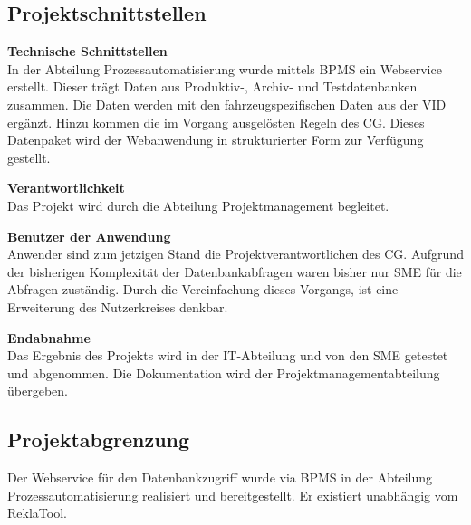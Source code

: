 \subsection{Projektschnittstellen} 
\label{sec:Projektschnittstellen}
\textbf{Technische Schnittstellen}\\
In der Abteilung Prozessautomatisierung wurde mittels \acs{BPMS} ein Webservice erstellt.
Dieser trägt Daten aus Produktiv-, Archiv- und Testdatenbanken zusammen.
Die Daten werden mit den fahrzeugspezifischen Daten aus der \acs{VID} ergänzt.
Hinzu kommen die im Vorgang ausgelösten Regeln des \acs{CG}.
Dieses Datenpaket wird der Webanwendung in strukturierter Form zur Verfügung gestellt.

\textbf{Verantwortlichkeit}\\
Das Projekt wird durch die Abteilung Projektmanagement begleitet.

\textbf{Benutzer der Anwendung}\\
Anwender sind zum jetzigen Stand die Projektverantwortlichen des \acs{CG}.
Aufgrund der bisherigen Komplexität der Datenbankabfragen waren bisher nur \ac{SME}
für die Abfragen zuständig. Durch die Vereinfachung dieses Vorgangs, ist eine Erweiterung des Nutzerkreises denkbar.

\textbf{Endabnahme}\\
Das Ergebnis des Projekts wird in der IT-Abteilung und von den \acs{SME} getestet und abgenommen.
Die Dokumentation wird der Projektmanagementabteilung übergeben.

\subsection{Projektabgrenzung} 
\label{sec:Projektabgrenzung}
Der Webservice für den Datenbankzugriff wurde via \acs{BPMS} in der Abteilung Prozessautomatisierung realisiert und bereitgestellt. 
Er existiert unabhängig vom ReklaTool.
